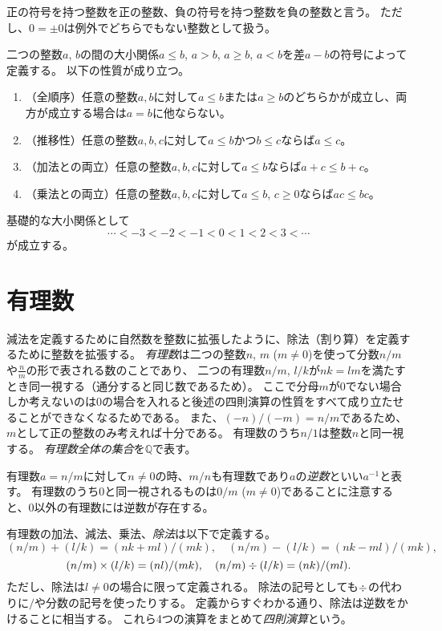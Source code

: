 正の符号を持つ整数を正の整数、負の符号を持つ整数を負の整数と言う。
ただし、$0 = \pm 0$は例外でどちらでもない整数として扱う。

二つの整数$a$, $b$の間の大小関係$a \le b$, $a > b$, $a \ge b$, $a < b$を差$a-b$の符号によって定義する。
以下の性質が成り立つ。
\begin{enumerate}
\item
（全順序）任意の整数$a, b$に対して$a \le b$または$a \ge b$のどちらかが成立し、両方が成立する場合は$a = b$に他ならない。
\item
（推移性）任意の整数$a, b, c$に対して$a \le b$かつ$b \le c$ならば$a \le c$。
\item
（加法との両立）任意の整数$a, b, c$に対して$a \le b$ならば$a+c \le b+c$。
\item
（乗法との両立）任意の整数$a, b, c$に対して$a \le b$, $c \ge 0$ならば$a c \le b c$。
\end{enumerate}
基礎的な大小関係として
$$
\cdots < -3 < -2 < -1 < 0 < 1 < 2 < 3 < \cdots
$$
が成立する。

\section{有理数}

減法を定義するために自然数を整数に拡張したように、除法（割り算）を定義するために整数を拡張する。
\emph{有理数}は二つの整数$n$, $m$ ($m \ne 0$)を使って分数$n/m$や$\frac{n}{m}$の形で表される数のことであり、
二つの有理数$n/m$, $l/k$が$n k = l m$を満たすとき同一視する（通分すると同じ数であるため）。
ここで分母$m$が$0$でない場合しか考えないのは$0$の場合を入れると後述の四則演算の性質をすべて成り立たせることができなくなるためである。
また、$(-n)/(-m) = n/m$であるため、$m$として正の整数のみ考えれば十分である。
有理数のうち$n/1$は整数$n$と同一視する。
\emph{有理数全体の集合}を$\mathbb{Q}$で表す。

有理数$a = n/m$に対して$n \ne 0$の時、$m/n$も有理数であり$a$の\emph{逆数}といい$a^{-1}$と表す。
有理数のうち$0$と同一視されるものは$0/m$ ($m \ne 0$)であることに注意すると、$0$以外の有理数には逆数が存在する。

有理数の加法、減法、乗法、\emph{除法}は以下で定義する。
$$
(n/m)+(l/k) = (n k+m l)/(m k),
\quad (n/m)-(l/k) = (n k-m l)/(m k),
$$
$$
(n/m)\times(l/k) = (n l)/(m k),
\quad (n/m)\divs(l/k) = (n k)/(m l).
$$
ただし、除法は$l \ne 0$の場合に限って定義される。
除法の記号としても$\divs$の代わりに$/$や分数の記号を使ったりする。
定義からすぐわかる通り、除法は逆数をかけることに相当する。
これら4つの演算をまとめて\emph{四則演算}という。


